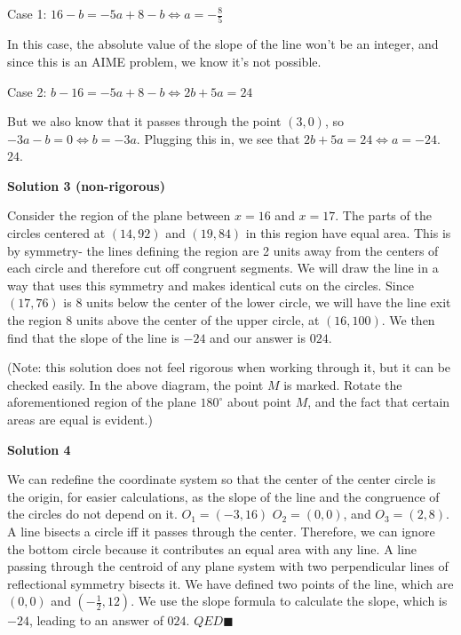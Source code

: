 \begin{enumerate}
 Case 1:  $16-b = -5a + 8 - b \Longleftrightarrow a = -\frac{8}{5}$

 In this case, the absolute value of the slope of the line won’t be an integer, and since this is an AIME problem, we know it’s not possible.

 Case 2:  $b-16 = -5a + 8 - b \Longleftrightarrow 2b + 5a = 24$

 But we also know that it passes through the point $(3,0)$, so $-3a-b = 0 \Longleftrightarrow b = -3a$. Plugging this in, we see that $2b + 5a = 24 \Longleftrightarrow a = -24$. $\boxed{24}$.

 



\textbf{Solution 3 (non-rigorous)}

Consider the region of the plane between $x=16$ and $x=17$. The parts of the circles centered at $(14,92)$ and $(19,84)$ in this region have equal area. This is by symmetry- the lines defining the region are 2 units away from the centers of each circle and therefore cut off congruent segments. We will draw the line in a way that uses this symmetry and makes identical cuts on the circles. Since $(17,76)$ is $8$ units below the center of the lower circle, we will have the line exit the region $8$ units above the center of the upper circle, at $(16,100)$. We then find that the slope of the line is $-24$ and our answer is $\boxed{024}$.

 (Note: this solution does not feel rigorous when working through it, but it can be checked easily. In the above diagram, the point $M$ is marked. Rotate the aforementioned region of the plane $180^\circ$ about point $M$, and the fact that certain areas are equal is evident.)

 



\textbf{Solution 4}

We can redefine the coordinate system so that the center of the center circle is the origin, for easier calculations, as the slope of the line and the congruence of the circles do not depend on it. $O_1=(-3, 16)$ $O_2=(0,0)$, and $O_3=(2,8)$. A line bisects a circle iff it passes through the center. Therefore, we can ignore the bottom circle because it contributes an equal area with any line. A line passing through the centroid of any plane system with two perpendicular lines of reflectional symmetry bisects it. We have defined two points of the line, which are $(0,0)$ and $(-\frac{1}{2},12)$. We use the slope formula to calculate the slope, which is $-24$, leading to an answer of $\boxed{024}$. $QED \blacksquare$


\end{enumerate}
